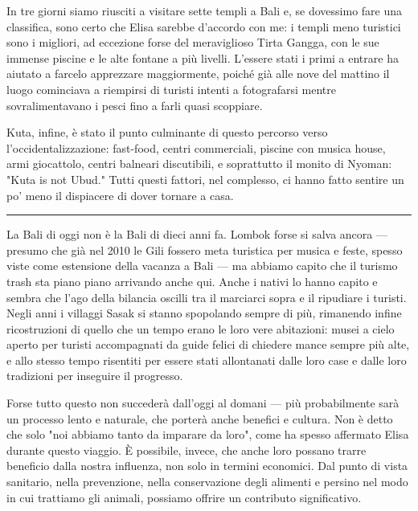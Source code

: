 In tre giorni siamo riusciti a visitare sette templi a Bali e, se dovessimo fare una classifica, sono certo che Elisa sarebbe d'accordo con me: i templi meno turistici sono i migliori, ad eccezione forse del meraviglioso Tirta Gangga, con le sue immense piscine e le alte fontane a più livelli. L'essere stati i primi a entrare ha aiutato a farcelo apprezzare maggiormente, poiché già alle nove del mattino il luogo cominciava a riempirsi di turisti intenti a fotografarsi mentre sovralimentavano i pesci fino a farli quasi scoppiare.

Kuta, infine, è stato il punto culminante di questo percorso verso l'occidentalizzazione: fast-food, centri commerciali, piscine con musica house, armi giocattolo, centri balneari discutibili, e soprattutto il monito di Nyoman: "Kuta is not Ubud." Tutti questi fattori, nel complesso, ci hanno fatto sentire un po' meno il dispiacere di dover tornare a casa.

\begin{center}
    \noindent\rule{0.6\textwidth}{0.4pt}
\end{center}

La Bali di oggi non è la Bali di dieci anni fa. Lombok forse si salva ancora — presumo che già nel 2010 le Gili fossero meta turistica per musica e feste, spesso viste come estensione della vacanza a Bali — ma abbiamo capito che il turismo trash sta piano piano arrivando anche qui. Anche i nativi lo hanno capito e sembra che l'ago della bilancia oscilli tra il marciarci sopra e il ripudiare i turisti. Negli anni i villaggi Sasak si stanno spopolando sempre di più, rimanendo infine ricostruzioni di quello che un tempo erano le loro vere abitazioni: musei a cielo aperto per turisti accompagnati da guide felici di chiedere mance sempre più alte, e allo stesso tempo risentiti per essere stati allontanati dalle loro case e dalle loro tradizioni per inseguire il progresso.

Forse tutto questo non succederà dall'oggi al domani — più probabilmente sarà un processo lento e naturale, che porterà anche benefici e cultura. Non è detto che solo "noi abbiamo tanto da imparare da loro", come ha spesso affermato Elisa durante questo viaggio. È possibile, invece, che anche loro possano trarre beneficio dalla nostra influenza, non solo in termini economici. Dal punto di vista sanitario, nella prevenzione, nella conservazione degli alimenti e persino nel modo in cui trattiamo gli animali, possiamo offrire un contributo significativo.


